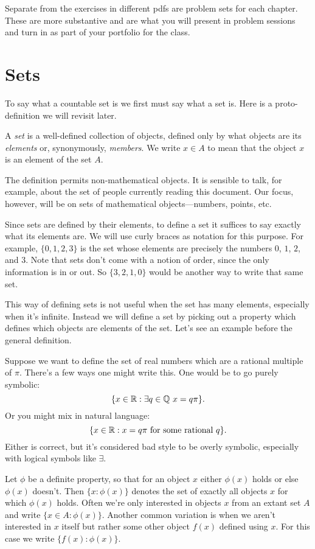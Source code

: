 \documentclass[10pt]{amsart}
\begin{document}
Separate from the exercises in different pdfs are problem sets for each chapter. These are more substantive and are what you will present in problem sessions and turn in as part of your portfolio for the class.

\newpage

\section{Sets}

To say what a countable set is we first must say what a set is. Here is a proto-definition we will revisit later.

\begin{protodefinition}
A \emph{set} is a well-defined collection of objects, defined only by what objects are its \emph{elements} or, synonymously, \emph{members}. We write $x \in A$ to mean that the object $x$ is an element of the set $A$. 
\end{protodefinition}

The definition permits non-mathematical objects. It is sensible to talk, for example, about the set of people currently reading this document. Our focus, however, will be on sets of mathematical objects---numbers, points, etc. 

Since sets are defined by their elements, to define a set it suffices to say exactly what its elements are. We will use curly braces as notation for this purpose. For example, $\{0,1,2,3\}$ is the set whose elements are precisely the numbers $0$, $1$, $2$, and $3$. Note that sets don't come with a notion of order, since the only information is in or out. So $\{3,2,1,0\}$ would be another way to write that same set. 

This way of defining sets is not useful when the set has many elements, especially when it's infinite. Instead we will define a set by picking out a property which defines which objects are elements of the set. Let's see an example before the general definition.

Suppose we want to define the set of real numbers which are a rational multiple of $\pi$. There's a few ways one might write this. One would be to go purely symbolic:
\[
\{ x \in \mathbb{R} : \exists q \in \mathbb{Q}\ x = q\pi \}.
\]
Or you might mix in natural language:
\[
\{ x \in \mathbb{R} : x = q\pi \text{ for some rational } q\}.
\]
Either is correct, but it's considered bad style to be overly symbolic, especially with logical symbols like $\exists$. 

\begin{definition}
Let $\phi$ be a definite property, so that for an object $x$ either $\phi(x)$ holds or else $\phi(x)$ doesn't. Then $\{ x : \phi(x) \}$ denotes the set of exactly all objects $x$ for which $\phi(x)$ holds. Often we're only interested in objects $x$ from an extant set $A$ and write $\{ x \in A : \phi(x) \}$. Another common variation is when we aren't interested in $x$ itself but rather some other object $f(x)$ defined using $x$. For this case we write $\{ f(x) : \phi(x) \}$.
\end{definition}
\end{document}
